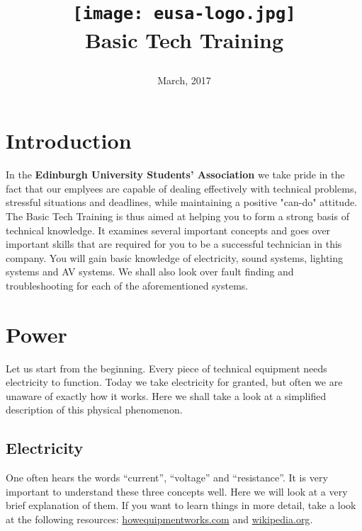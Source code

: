\documentclass[14pt]{article} %
\title{
\begin{center}
  \LARGE
  \texttt{[image: eusa-logo.jpg]}\\[\bigskipamount]
\huge {\textbf{Basic Tech Training}}
\end{center}
} %
\date{March, 2017}
\let\Oldsection\section
\renewcommand{\section}{\FloatBarrier\Oldsection}
\let\Oldsubsection\subsection
\renewcommand{\subsection}{\FloatBarrier\Oldsubsection}
\begin{document}
\begin{@twocolumnfalse}
\maketitle


 \end{@twocolumnfalse}


\section{Introduction}
\label{intro}
In the \textbf{Edinburgh University Students' Association} we take pride in the fact that our emplyees are capable of dealing effectively with technical problems, stressful situations and deadlines, while maintaining a positive "can-do" attitude.
The Basic Tech Training is thus aimed at helping you to form a strong basis of technical knowledge. It examines several important concepts and goes over important skills that are required for you to be a successful technician in this company. You will gain basic knowledge of electricity, sound systems, lighting systems and AV systems. We shall also look over fault finding and troubleshooting for each of the aforementioned systems.


\section{Power}
\label{power}

Let us start from the beginning. Every piece of technical equipment needs electricity to function. Today we take electricity for granted, but often we are unaware of exactly how it works. Here we shall take a look at a simplified description of this physical phenomenon. 

\subsection{Electricity}
\label{electricity}
One often hears the words “current”, “voltage” and “resistance”. It is very important to understand these three concepts well. Here we will look at a very brief explanation of them. If you want to learn things in more detail, take a look at the following resources: \href{https://www.howequipmentworks.com/electricity_basics/}{howequipmentworks.com} and \href{https://en.wikipedia.org/wiki/Electricity#Electric_charge}{wikipedia.org}.
\end{document}

